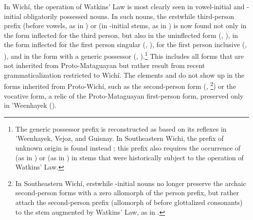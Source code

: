 In Wichí, the operation of Watkins’ Law is most clearly seen in vowel-initial and \mbox{-}initial obligatorily possessed nouns. In such nouns, the erstwhile third-person prefix  (before vowels, as in ) or  (in \mbox{-}initial stems, as in ) is now found not only in the form inflected for the third person, but also in the uninflected form (, ), in the form inflected for the first person singular (, ), for the first person inclusive (, ), and in the form with a generic possessor (, ).\footnote{The generic possessor prefix is reconstructed as  based on its reflexes in ’Weenhayek, Vejoz, and Guisnay. In Southeastern Wichi, the prefix  of unknown origin is found instead \citep[163]{VN14}; this prefix also requires the occurrence of  (as in ) or  (as in ) in stems that were historically subject to the operation of Watkins’ Law.} This includes all forms that are not inherited from Proto-Mataguayan but rather result from recent grammaticalization restricted to Wichí. The elements  and  do not show up in the forms inherited from Proto-Wichí, such as the second-person form (, \footnote{In Southeastern Wichí, erstwhile \mbox{-}initial nouns no longer preserve the archaic second-person forms with a zero allomorph of the person prefix, but rather attach the second-person prefix  (allomorph of  before glottalized consonants) to the stem augmented by Watkins’ Law, as in  \citep[164]{VN14}.}) or the vocative form, a relic of the Proto-Mataguayan first-person form, preserved only in ’Weenhayek ().

\begin{exe}
    \ex \mouth
    \ex \brightness
    \ex \flower
    \ex \fruit
    \ex \food
    \ex \son
    \ex \daughter
    \ex \drinkn
    \ex \wing
    \ex \yicaay
    \ex \thorne
    \ex \namen
    \ex \inhabitant
    \ex \resin
    \ex \penis
    \ex \seed
    \ex \nest
    \ex \cord
    \ex \femalebreast
    \ex \skin
    \ex \meat
    \ex \juice
    \ex \urine
\end{exe}

